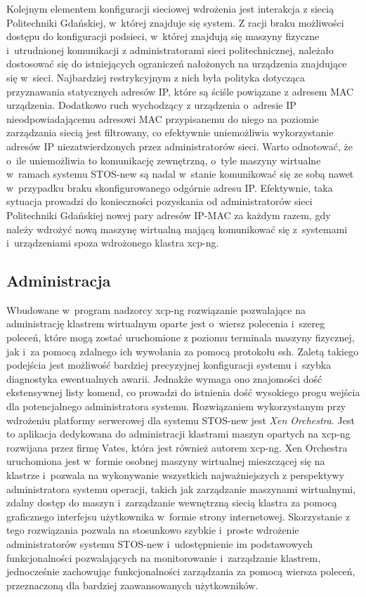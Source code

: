 \noindent Kolejnym elementem konfiguracji sieciowej wdrożenia jest interakcja z siecią Politechniki Gdańskiej, w~której znajduje się system. Z racji braku możliwości dostępu do konfiguracji podsieci, w~której znajdują się maszyny fizyczne i~utrudnionej komunikacji z administratorami sieci politechnicznej, należało dostosować się do istniejących ograniczeń nałożonych na urządzenia znajdujące się w~sieci. Najbardziej restrykcyjnym z nich była polityka dotycząca przyznawania statycznych adresów IP, które są ściśle powiązane z adresem MAC urządzenia. Dodatkowo ruch wychodzący z urządzenia o~adresie IP nieodpowiadającemu adresowi MAC przypisanemu do niego na poziomie zarządzania siecią jest filtrowany, co efektywnie uniemożliwia wykorzystanie adresów IP niezatwierdzonych przez administratorów sieci. Warto odnotować, że o~ile uniemożliwia to komunikację zewnętrzną, o~tyle maszyny wirtualne w~ramach systemu STOS-new są nadal w~stanie komunikować się ze sobą nawet w~przypadku braku skonfigurowanego odgórnie adresu IP. Efektywnie, taka sytuacja prowadzi do konieczności pozyskania od administratorów sieci Politechniki Gdańskiej nowej pary adresów IP-MAC za każdym razem, gdy należy wdrożyć nową maszynę wirtualną mającą komunikować się z~systemami i~urządzeniami spoza wdrożonego klastra xcp-ng.
\subsection{Administracja}
Wbudowane w~program nadzorcy xcp-ng rozwiązanie pozwalające na administrację klastrem wirtualnym oparte jest o~wiersz polecenia i~szereg poleceń, które mogą zostać uruchomione z poziomu terminala maszyny fizycznej, jak i~za pomocą zdalnego ich wywołania za pomocą protokołu ssh. Zaletą takiego podejścia jest możliwość bardziej precyzyjnej konfiguracji systemu i~szybka diagnostyka ewentualnych awarii. Jednakże wymaga ono znajomości dość ekstensywnej listy komend, co prowadzi do istnienia dość wysokiego progu wejścia dla potencjalnego administratora systemu. 
\noindent Rozwiązaniem wykorzystanym przy wdrożeniu platformy serwerowej dla systemu STOS-new jest \textit{Xen Orchestra}. Jest to aplikacja dedykowana do administracji klastrami maszyn opartych na xcp-ng rozwijana przez firmę Vates, która jest również autorem xcp-ng. Xen Orchestra uruchomiona jest w~formie osobnej maszyny wirtualnej mieszczącej się na klastrze i~pozwala na wykonywanie wszystkich najważniejszych z perspektywy administratora systemu operacji, takich jak zarządzanie maszynami wirtualnymi, zdalny dostęp do maszyn i~zarządzanie wewnętrzną siecią klastra za pomocą graficznego interfejsu użytkownika w~formie strony internetowej\cite{xoa}. Skorzystanie z tego rozwiązania pozwala na stosunkowo szybkie i~proste wdrożenie administratorów systemu STOS-new i~udostępnienie im podstawowych funkcjonalności pozwalających na monitorowanie i~zarządzanie klastrem, jednocześnie zachowując funkcjonalności zarządzania za pomocą wiersza poleceń, przeznaczoną dla bardziej zaawansowanych użytkowników.
